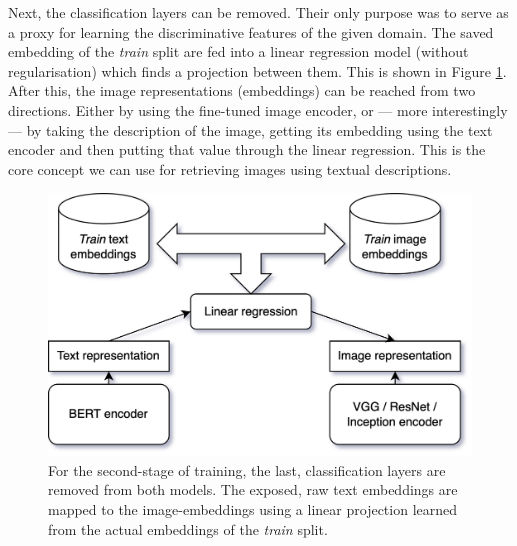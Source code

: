 Next, the classification layers can be removed. Their only purpose was to serve as a proxy for learning the discriminative features of the given domain. The saved embedding of the \textit{train} split are fed into a linear regression model (without regularisation) which finds a projection between them. This is shown in Figure \ref{fig:train}. After this, the image representations (embeddings) can be reached from two directions. Either by using the fine-tuned image encoder, or --- more interestingly --- by taking the description of the image, getting its embedding using the text encoder and then putting that value through the linear regression. This is the core concept we can use for retrieving images using textual descriptions.

\begin{figure}
  \centering
  \includegraphics[width=1 \linewidth]{figures/train.drawio.png}
  \caption{For the second-stage of training, the last, classification layers are removed from both models. The exposed, raw text embeddings are mapped to the image-embeddings using a linear projection learned from the actual embeddings of the \textit{train} split.}
  \label{fig:train}
\end{figure}

